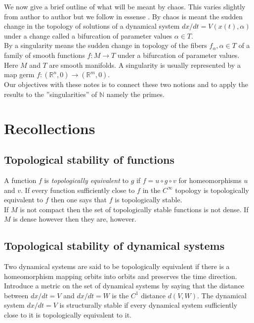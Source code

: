 \documentclass[10pt,a4paper]{amsart}
\begin{document}
We now give a brief outline of what will be meant by chaos. This varies slightly from author to author but we follow in essense \cite{Demazure}.
By chaos is meant the sudden change in the topology of solutions of a dynamical system $dx/dt=V(x(t), \alpha)$ under a change called a bifurcation of parameter values $\alpha\in T$. \\
By a singularity means the sudden change in topology of the fibers $f_{\alpha}, \alpha\in T$ of a family of smooth functions $f: M\to T$ under a bifurcation of parameter values. Here $M$ and $T$ are smooth manifolds. A singularity is usually represented by a map germ $f: (\mathbb{R}^n, 0)\to (\mathbb{R}^m, 0)$.\\

Our objectives with these notes is to connect these two notions and to apply the results to the ''singularities'' of $\mathbb{N}$ namely the primes. 

\section{Recollections}

\subsection{Topological stability of functions} A function $f$ is \emph{topologically equivalent} to $g$ if $f=u\circ g\circ v$ for homeomorphisms $u$ and $v$. If every function sufficiently close to $f$ in the $C^{\infty}$ topology is topologically equivalent to $f$ then one says that $f$ is topologically stable.\\

If $M$ is not compact then the set of topologically stable functions is not dense. If $M$ is dense however then they are, however.\\

\subsection{Topological stability of dynamical systems} Two dynamical systems are said to be {topologically equivalent} if there is a homeomorphism mapping orbits into orbits and preserves the time direction. Introduce a metric on the set of dynamical systems by saying that the distance between $dx/dt=V$ and $dx/dt=W$ is the $C^1$ distance $d(V, W)$. The dynamical system $dx/dt=V$ is structurally stable if every dynamical system sufficiently close to it is topologically equivalent to it.\\
\end{document}

